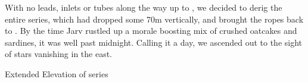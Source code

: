 With no leads, inlets or tubes along the way up to , we decided to derig the entire series, which had dropped some 70m vertically, and brought the ropes back to . By the time Jarv rustled up a morale boosting mix of crushed oatcakes and sardines, it was well past midnight. Calling it a day, we ascended out to the sight of stars vanishing in the east. 


\begin{pagesurvey}
\checkoddpage \ifoddpage \forcerectofloat \else \forceversofloat \fi
{}
\caption[Extended Elevation of Jack of Hearts]{Extended Elevation of \protect{} series }
\end{pagesurvey}
